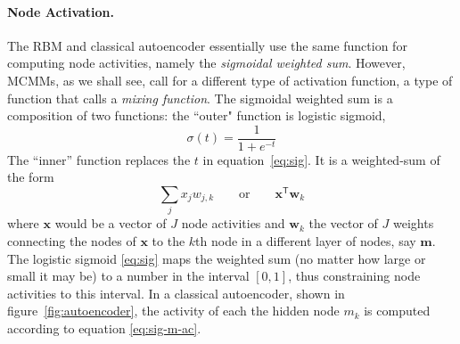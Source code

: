 \paragraph{Node Activation.} The RBM and classical autoencoder essentially use the same function for computing node activities, namely the \emph{sigmoidal weighted sum}.
However, MCMMs, as we shall see, call for a different type of activation function, a type of function that \citet{saund:94} calls a \emph{mixing function}.
The sigmoidal weighted sum is a composition of two functions: the ``outer" function is logistic sigmoid, 
	\begin{equation} %
	\label{eq:sig}
	\sigma(t) = \frac{1}{1 + e^{-t}} 
	\end{equation} %
The ``inner'' function replaces the $t$ in equation~\eqref{eq:sig}. It is a weighted-sum of the form 
\begin{equation} \label{eq:wtd-sum}
\sum_{j} x_{j} w_{j,k} \qquad  \text{or} \qquad \textbf{x}^{\textsf{T}}\textbf{w}_k
\end{equation}
where $\textbf{x}$ would be a vector of $J$ node activities and $\textbf{w}_k$ the vector of $J$ weights connecting the nodes of $\textbf{x}$ to the $k$th node in a different layer of nodes, say $\textbf{m}$. 
The logistic sigmoid \eqref{eq:sig} maps the weighted sum (no matter how large or small it may be) to a number in the interval $[0,1]$, thus constraining node activities to this interval.
In a classical autoencoder, shown in figure~\ref{fig:autoencoder}, the activity of each the hidden node $m_k$ is computed according to equation \ref{eq:sig-m-ac}. 
